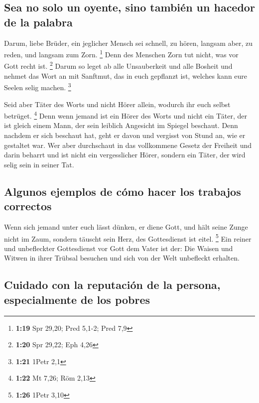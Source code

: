 \hypertarget{sea-no-solo-un-oyente-sino-tambiuxe9n-un-hacedor-de-la-palabra}{%
\subsection{Sea no solo un oyente, sino también un hacedor de la
palabra}\label{sea-no-solo-un-oyente-sino-tambiuxe9n-un-hacedor-de-la-palabra}}

 Darum, liebe Brüder, ein jeglicher Mensch sei schnell,
zu hören, langsam aber, zu reden, und langsam zum Zorn. \footnote{\textbf{1:19}
  Spr 29,20; Pred 5,1-2; Pred 7,9}  Denn des Menschen
Zorn tut nicht, was vor Gott recht ist. \footnote{\textbf{1:20} Spr
  29,22; Eph 4,26}  Darum so leget ab alle Unsauberkeit
und alle Bosheit und nehmet das Wort an mit Sanftmut, das in euch
gepflanzt ist, welches kann eure Seelen selig machen. \footnote{\textbf{1:21}
  1Petr 2,1}

 Seid aber Täter des Worts und nicht Hörer allein,
wodurch ihr euch selbst betrüget. \footnote{\textbf{1:22} Mt 7,26; Röm
  2,13}  Denn wenn jemand ist ein Hörer des Worts und
nicht ein Täter, der ist gleich einem Mann, der sein leiblich Angesicht
im Spiegel beschaut.  Denn nachdem er sich beschaut hat,
geht er davon und vergisst von Stund an, wie er gestaltet war.
 Wer aber durchschaut in das vollkommene Gesetz der
Freiheit und darin beharrt und ist nicht ein vergesslicher Hörer,
sondern ein Täter, der wird selig sein in seiner Tat.

\hypertarget{algunos-ejemplos-de-cuxf3mo-hacer-los-trabajos-correctos}{%
\subsection{Algunos ejemplos de cómo hacer los trabajos
correctos}\label{algunos-ejemplos-de-cuxf3mo-hacer-los-trabajos-correctos}}

 Wenn sich jemand unter euch lässt dünken, er diene Gott,
und hält seine Zunge nicht im Zaum, sondern täuscht sein Herz, des
Gottesdienst ist eitel. \footnote{\textbf{1:26} 1Petr 3,10}
 Ein reiner und unbefleckter Gottesdienst vor Gott dem
Vater ist der: Die Waisen und Witwen in ihrer Trübsal besuchen und sich
von der Welt unbefleckt erhalten.

\hypertarget{cuidado-con-la-reputaciuxf3n-de-la-persona-especialmente-de-los-pobres}{%
\subsection{Cuidado con la reputación de la persona, especialmente de
los
pobres}\label{cuidado-con-la-reputaciuxf3n-de-la-persona-especialmente-de-los-pobres}}

